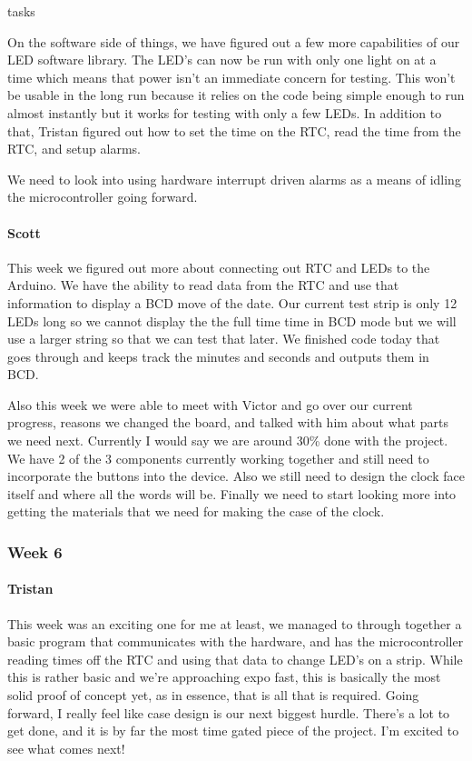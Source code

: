 tasks\documentclass[onecolumn, draftclsnofoot,10pt, compsoc]{IEEEtran}
\begin{document}
On the software side of things, we have figured out a few more capabilities of our LED software library. The LED's can now be run with only one light on at a time which means that power isn't an immediate concern for testing. This won't be usable in the long run because it relies on the code being simple enough to run almost instantly but it works for testing with only a few LEDs. In addition to that, Tristan figured out how to set the time on the RTC, read the time from the RTC, and setup alarms.

We need to look into using hardware interrupt driven alarms as a means of idling the microcontroller going forward.
\paragraph{Scott}
This week we figured out more about connecting out RTC and LEDs to the Arduino. We have the ability to read data from the RTC and use that information to display a BCD move of the date. Our current test strip is only 12 LEDs long so we cannot display the the full time time in BCD mode but we will use a larger string so that we can test that later. We finished code today that goes through and keeps track the minutes and seconds and outputs them in BCD.

Also this week we were able to meet with Victor and go over our current progress, reasons we changed the board, and talked with him about what parts we need next. Currently I would say we are around 30\% done with the project. We have 2 of the 3 components currently working together and still need to incorporate the buttons into the device. Also we still need to design the clock face itself and where all the words will be. Finally we need to start looking more into getting the materials that we need for making the case of the clock.
\subsubsection{Week 6}
\paragraph{Tristan}
This week was an exciting one for me at least, we managed to through together a basic program that communicates with the hardware, and has the microcontroller reading times off the RTC and using that data to change LED's on a strip. While this is rather basic and we're approaching expo fast, this is basically the most solid proof of concept yet, as in essence, that is all that is required. Going forward, I really feel like case design is our next biggest hurdle. There's a lot to get done, and it is by far the most time gated piece of the project. I'm excited to see what comes next!
\end{document}
